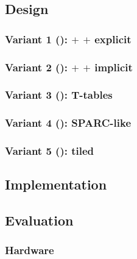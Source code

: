 \documentclass[preprint]{iacrtrans}
\begin{document}
\subsection{Design}



\subsubsection{Variant 1 ():  $+$  $+$ explicit }
\label{sec:ise:design:v1}

\subsubsection{Variant 2 ():  $+$  $+$ implicit }
\label{sec:ise:design:v2}

\subsubsection{Variant 3 (): T-tables}
\label{sec:ise:design:v3}

\subsubsection{Variant 4 (): SPARC-like}
\label{sec:ise:design:v4}

\subsubsection{Variant 5 (): tiled}
\label{sec:ise:design:v5}



\subsection{Implementation}
\label{sec:ise:imp}



\subsection{Evaluation}

\subsubsection{Hardware}
\label{sec:ise:eval:hw}

\end{document}
